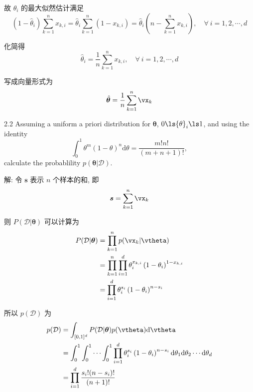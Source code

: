 \documentclass[openany]{ctexbook}
\theoremstyle{kaiti}
\theoremstyle{normal}
\begin{document}
故 $\theta_i$ 的最大似然估计满足
\begin{equation}
  (1-\hat{\theta}_i)\sum_{k=1}^nx_{k,i}=\hat{\theta}_i\sum_{k=1}^n(1-x_{k,i})=\hat{\theta}_i\left(n-\sum_{k=1}^nx_{k,i}\right),\quad\forall~i=1,2,\cdots,d
\end{equation}

化简得
\begin{equation}
  \hat{\theta}_i=\frac{1}{n}\sum_{k=1}^nx_{k,i},\quad\forall~i=1,2,\cdots,d
\end{equation}

写成向量形式为
\begin{equation}
  \hat{\bm{\theta}}=\frac{1}{n}\sum_{k=1}^n\vx_k
\end{equation}

2.2 Assuming a uniform a priori distribution for $\bm{\theta}$, $0 \ls {\theta}_i \ls 1$, and using the identity
\begin{equation}
  \int_{0}^{1} \theta^{m}(1-\theta)^{n} \mathrm{d}\theta=\frac{m ! n !}{(m+n+1) !},
\end{equation}
calculate the probablility $p(\bm{\theta}|\mathcal{D})$.

解: 令 $\bm{s}$ 表示 $n$ 个样本的和, 即
\begin{equation}
  \bm{s}=\sum_{k=1}^n\vx_k
\end{equation}

则 $P(\mathcal{D}|\bm{\theta})$ 可以计算为
\begin{equation}
  \begin{aligned}
    P(\mathcal{D}|\bm{\theta})
    &=\prod_{k=1}^np(\vx_k|\vtheta)\\
    &=\prod_{k=1}^n\prod_{i=1}^d \theta_{i}^{x_{k,i}}\left(1-\theta_{i}\right)^{1-x_{k,i}}\\
    &=\prod_{i=1}^d\theta_{i}^{s_{i}}\left(1-\theta_{i}\right)^{n-s_{i}}\\
  \end{aligned}
\end{equation}

所以 $p(\mathcal{D})$ 为
\begin{equation}
  \begin{aligned}
    p(\mathcal{D})
    &=\int_{[0,1]^d} P(\mathcal{D}|\bm{\theta})p(\vtheta)\mathrm{d}\vtheta\\
    &=\int_0^1\int_0^1\cdots\int_0^1 \prod_{i=1}^d\theta_{i}^{s_{i}}\left(1-\theta_{i}\right)^{n-s_{i}}\mathrm{d}\theta_1\mathrm{d}\theta_2\cdots\mathrm{d}\theta_d\\
    &=\prod_{i=1}^d\frac{s_i!(n-s_i)!}{(n+1)!}\\
  \end{aligned}
\end{equation}
\end{document}
